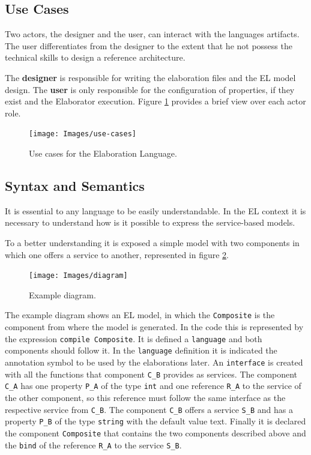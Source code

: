 \documentclass[11pt]{report}
\begin{document}
		\subsection{Use Cases}
		
		\par Two actors, the designer and the user, can interact with the languages artifacts. The user differentiates
		from the designer to the extent that he not possess the technical skills to design a reference architecture.
		\par The \textbf{designer} is responsible for writing the elaboration files and the EL model design. The \textbf{user} is only responsible for the configuration of properties, if they exist and the Elaborator execution. Figure \ref{fig:use-cases} provides a brief view over each actor role.
		
		\begin{figure} [H]
			\centering
			\texttt{[image: Images/use-cases]}
			\caption{Use cases for the Elaboration Language.}
			\label{fig:use-cases}
		\end{figure}
		
		\subsection{Syntax and Semantics}
		
		\par It is essential to any language to be easily understandable. In the EL context it is necessary to understand how is it possible to express the service-based models.
		\par To a better understanding it is exposed a simple model with two components in which one offers a service to another, represented in figure \ref{fig:example-diagram}.
		
		\begin{figure} [H]
			\centering
			\texttt{[image: Images/diagram]}
			\caption{Example diagram.}
			\label{fig:example-diagram}
		\end{figure}
		
		\par The example diagram shows an EL model, in which the \texttt{Composite} is the component from where the model is generated. In the code this is represented by the expression \texttt{compile Composite}. It is defined a \texttt{language} and both components should follow it. In the \texttt{language} definition it is indicated the annotation symbol to be used by the elaborations later. An \texttt{interface} is created with all the functions that component \texttt{C\_B} provides as services. The component \texttt{C\_A} has one property \texttt{P\_A} of the type \texttt{int} and one reference \texttt{R\_A} to the service of the other component, so this reference must follow the same interface as the respective service from \texttt{C\_B}. The component \texttt{C\_B} offers a service \texttt{S\_B} and has a property \texttt{P\_B} of the type \texttt{string} with the default value text. Finally it is declared the component \texttt{Composite} that contains the two components described above and the \texttt{bind} of the reference \texttt{R\_A} to the service \texttt{S\_B}.
		
\end{document}
